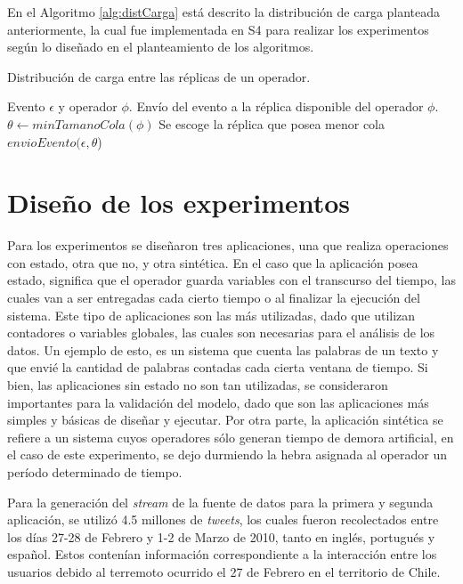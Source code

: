 En el Algoritmo \ref{alg:distCarga} está descrito la distribución de carga planteada anteriormente, la cual fue implementada en S4 para realizar los experimentos según lo diseñado en el planteamiento de los algoritmos.

\begin{algorithm}[!ht]
	\caption{Distribución de carga entre las réplicas de un operador.}
	\label{alg:distCarga}
	\begin{algorithmic}[1]
	\REQUIRE Evento $\epsilon$ y operador $\phi$.
	\ENSURE Envío del evento a la réplica disponible del operador $\phi$.
	\STATE $\theta \leftarrow minTamanoCola(\phi)$ \COMMENT Se escoge la réplica que posea menor cola
	\STATE $envioEvento(\epsilon,\theta$)
	\end{algorithmic}
\end{algorithm}

\section{Diseño de los experimentos}
Para los experimentos se diseñaron tres aplicaciones, una que realiza operaciones con estado, otra que no, y otra sintética. En el caso que la aplicación posea estado, significa que el operador guarda variables con el transcurso del tiempo, las cuales van a ser entregadas cada cierto tiempo o al finalizar la ejecución del sistema. Este tipo de aplicaciones son las más utilizadas, dado que utilizan contadores o variables globales, las cuales son necesarias para el análisis de los datos. Un ejemplo de esto, es un sistema que cuenta las palabras de un texto y que envié la cantidad de palabras contadas cada cierta ventana de tiempo. Si bien, las aplicaciones sin estado no son tan utilizadas, se consideraron importantes para la validación del modelo, dado que son las aplicaciones más simples y básicas de diseñar y ejecutar. Por otra parte, la aplicación sintética se refiere a un sistema cuyos operadores sólo generan tiempo de demora artificial, en el caso de este experimento, se dejo durmiendo la hebra asignada al operador un período determinado de tiempo.

Para la generación del \textit{stream} de la fuente de datos para la primera y segunda aplicación, se utilizó 4.5 millones de \textit{tweets}, los cuales fueron recolectados entre los días 27-28 de Febrero y 1-2 de Marzo de 2010, tanto en inglés, portugués y español. Estos contenían información correspondiente a la interacción entre los usuarios debido al terremoto ocurrido el 27 de Febrero en el territorio de Chile.

